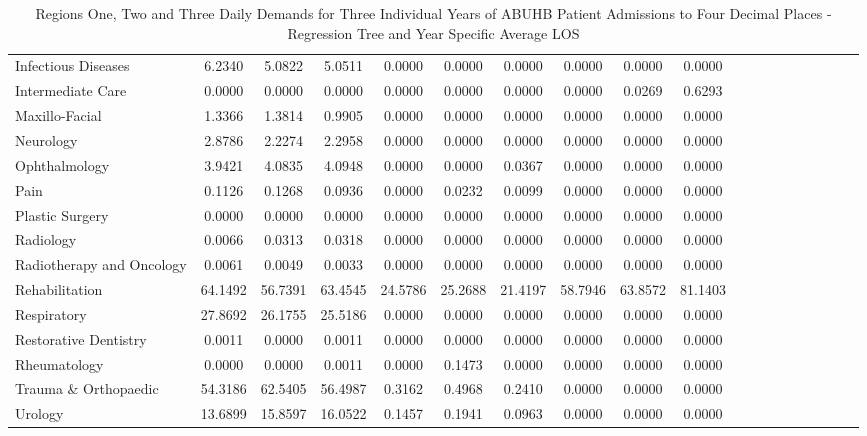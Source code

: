 \documentclass[thesis.tex]{subfiles}
\begin{document}
\begin{landscape}
\begin{table}[h!]
{\begin{tabular}{lcccccccccccccccccc}
Infectious Diseases	&6.2340&	5.0822&	5.0511&	0.0000&	0.0000&	0.0000&	0.0000&	0.0000&	0.0000\\
Intermediate Care	&0.0000&	0.0000&	0.0000&	0.0000&	0.0000&	0.0000&	0.0000&	0.0269&	0.6293\\
Maxillo-Facial&	1.3366&	1.3814&	0.9905&	0.0000&	0.0000&	0.0000&	0.0000&	0.0000&	0.0000\\
Neurology	&2.8786&	2.2274&	2.2958&	0.0000&	0.0000&	0.0000&	0.0000&	0.0000&	0.0000\\
Ophthalmology	&3.9421&	4.0835&	4.0948&	0.0000&	0.0000&	0.0367&	0.0000&	0.0000&	0.0000\\
Pain	&0.1126&	0.1268&	0.0936&	0.0000&	0.0232&	0.0099&	0.0000&	0.0000&	0.0000\\
Plastic Surgery	&0.0000&	0.0000&	0.0000&	0.0000&	0.0000&	0.0000&	0.0000&	0.0000&	0.0000\\
Radiology	&0.0066&	0.0313&	0.0318&	0.0000&	0.0000&	0.0000&	0.0000&	0.0000&	0.0000\\
Radiotherapy and Oncology&	0.0061&	0.0049&	0.0033&	0.0000&	0.0000&	0.0000&	0.0000&	0.0000&	0.0000\\
Rehabilitation	&64.1492&	56.7391&	63.4545&	24.5786&	25.2688&	21.4197&	58.7946&	63.8572&	81.1403\\
Respiratory	&27.8692&	26.1755&	25.5186&	0.0000&	0.0000&	0.0000&	0.0000&	0.0000&	0.0000\\
Restorative Dentistry	&0.0011&	0.0000&	0.0011&	0.0000&	0.0000&	0.0000&	0.0000&	0.0000&	0.0000\\
Rheumatology	&0.0000&	0.0000&	0.0011&	0.0000&	0.1473&	0.0000&	0.0000&	0.0000&	0.0000\\
Trauma \& Orthopaedic&	54.3186&	62.5405&	56.4987&	0.3162&	0.4968&	0.2410&	0.0000&	0.0000&	0.0000\\
Urology	&13.6899&	15.8597&	16.0522&	0.1457&	0.1941&	0.0963&	0.0000&	0.0000&	0.0000\\

\bottomrule
\end{tabular}  } 
\caption{Regions One, Two and Three Daily Demands for Three Individual Years of ABUHB Patient Admissions to Four Decimal Places - Regression Tree and Year Specific Average LOS}
    \label{apptab:LinkedDemands3a}
\end{table}

\begin{table}[h!]
    \centering{}
\end{table}
\end{landscape}
\end{document}
